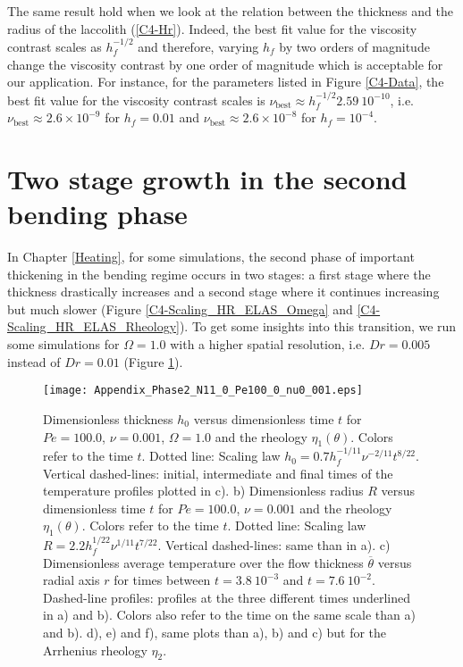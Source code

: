 The  same  result hold  when  we  look  at  the relation  between  the
thickness and the  radius of the laccolith  (\ref{C4-Hr}). Indeed, the
best fit value  for the viscosity contrast scales  as $h_f^{-1/2}$ and
therefore,  varying  $h_f$ by  two  orders  of magnitude  change  the
viscosity contrast by  one order of magnitude which  is acceptable for
our application.   For instance, for  the parameters listed  in Figure
\ref{C4-Data}, the best fit value for the viscosity contrast scales is
$\nu_{\text{best}}\approx        h_f^{-1/2}2.59~10^{-10}$,        i.e.
$\nu_{\text{best}}\approx  2.6\times   10^{-9}$  for   $h_f=0.01$  and
$\nu_{\text{best}}\approx 2.6\times 10^{-8}$ for $h_f=10^{-4}$.


\section{Two stage growth in the second bending phase}
\label{C4-Heat:AppendixC}

In Chapter  \ref{Heating}, for some  simulations, the second  phase of
important thickening  in the  bending regime occurs  in two  stages: a
first stage  where the  thickness drastically  increases and  a second
stage  where   it  continues   increasing  but  much   slower  (Figure
\ref{C4-Scaling_HR_ELAS_Omega} and \ref{C4-Scaling_HR_ELAS_Rheology}).
To get some insights into this transition, we run some simulations for
$\Omega=1.0$  with  a  higher  spatial  resolution,  i.e.   $Dr=0.005$
instead               of               $Dr=0.01$               (Figure
\ref{C4-Appendix_Phase2_N11_0_Pe100_0_nu0_001}).

\begin{figure}[h!]
  \begin{center}
    \graphicspath{ {/Users/thorey/Documents/These/Projet/Refroidissement/Skin_Model/Figure/Figure_Heating/} }
    \texttt{[image: Appendix\_Phase2\_N11\_0\_Pe100\_0\_nu0\_001.eps]}
    \caption{Dimensionless thickness  $h_0$ versus  dimensionless time
      $t$ for  $Pe=100.0$, $\nu=0.001$, $\Omega=1.0$ and  the rheology
      $\eta_1(\theta)$.  Colors  refer to the time  $t$.  Dotted line:
      Scaling  law $h_0=  0.7h_f^{-1/11}\nu^{-2/11}t^{8/22}$. Vertical
      dashed-lines:  initial,  intermediate  and final  times  of  the
      temperature profiles plotted in c).  b) Dimensionless radius $R$
      versus dimensionless  time $t$  for $Pe=100.0$,  $\nu=0.001$ and
      the rheology  $\eta_1(\theta)$.  Colors  refer to the  time $t$.
      Dotted line:  Scaling law  $R= 2.2h_f^{1/22}\nu^{1/11}t^{7/22}$.
      Vertical dashed-lines: same than in a). c) Dimensionless average
      temperature over  the flow thickness  $\overline{\theta}$ versus
      radial   axis  $r$   for  times   between  $t=3.8~10^{-3}$   and
      $t=7.6~10^{-2}$.   Dashed-line profiles:  profiles at  the three
      different times  underlined in a)  and b). Colors also  refer to
      the time on the same scale than  a) and b).  d), e) and f), same
      plots  than  a),  b)  and  c) but  for  the  Arrhenius  rheology
      $\eta_2$.}
    \label{C4-Appendix_Phase2_N11_0_Pe100_0_nu0_001}
  \end{center}
\end{figure}

